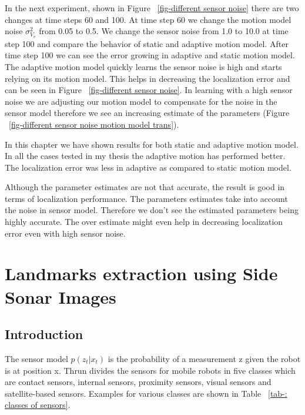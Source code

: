 \documentclass[12pt]{dalcsthesis}
\begin{document}
In the next experiment, shown in Figure ~\ref{fig-different sensor noise} there are two changes at time steps 60 and 100. At time step 60 we change the motion model noise $\sigma_{V_{v}}^2$ from 0.05 to 0.5. We change the sensor noise from 1.0 to 10.0 at time step 100 and compare the behavior of static and adaptive motion model. After time step 100 we can see the error growing in adaptive and static motion model. The adaptive motion model quickly learns the sensor noise is high and starts relying on its motion model. This helps in decreasing the localization error and can be seen in Figure ~\ref{fig-different sensor noise}. In learning with a high sensor noise we are adjusting our motion model to compensate for the noise in the sensor model therefore we see an increasing estimate of the parameters (Figure ~\ref{fig-different sensor noise motion model trans}).

In this chapter we have shown results for both static and adaptive motion model. In all the cases tested in my thesis the adaptive motion has performed better. The localization error was less in adaptive as compared to static motion model.

Although the parameter estimates are not that accurate, the result is good in terms of localization performance. The parameters estimates take into account the noise in sensor model. Therefore we don't see the estimated parameters being highly accurate. The over estimate might even help in decreasing localization error even with high sensor noise.


\chapter{Landmarks extraction using Side Sonar Images}
\section{Introduction}
The sensor model $p(z_{t}|x_{t})$ is the probability of a measurement z given the robot is at position x. Thrun \cite{thrun2005probabilistic} divides the sensors for mobile robots in five classes which are contact sensors, internal sensors, proximity sensors, visual sensors and satellite-based sensors. Examples for various classes are shown in Table ~\ref{tab-: classes of sensors}.
\end{document}
